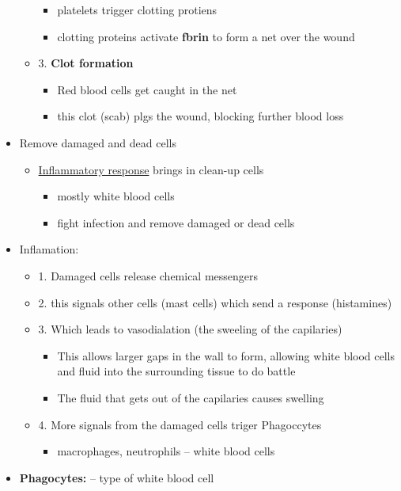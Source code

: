 \documentclass{article}
\theoremstyle{definition}
\begin{document}
\begin{itemize}
\begin{itemize}
\begin{itemize}
					\item platelets trigger clotting protiens
					\item clotting proteins activate \textbf{fbrin}  to form a net over the wound
				\end{itemize}
			\item 3. \textbf{Clot formation} 
				\begin{itemize}
					\item Red blood cells get caught in the net 
					\item this clot (scab) plgs the wound, blocking further blood loss
				\end{itemize}
		\end{itemize}
	\item Remove damaged and dead cells
		\begin{itemize}
			\item \underline{Inflammatory response} brings in clean-up cells
				\begin{itemize}
					\item mostly white blood cells
					\item fight infection and remove damaged or dead cells
				\end{itemize}
		\end{itemize}
	\item Inflamation:
		\begin{itemize}
			\item 1. Damaged cells release chemical messengers
			\item 2. this signals other cells (mast cells) which send a response (histamines)
			\item 3. Which leads to vasodialation (the sweeling of the capilaries)
				\begin{itemize}
					\item This allows larger gaps in the wall to form, allowing white blood cells and fluid into the surrounding tissue to do battle
					\item The fluid that gets out of the capilaries causes swelling
				\end{itemize}
			\item 4. More signals from the damaged cells triger Phagoccytes
				\begin{itemize}
					\item macrophages, neutrophils -- white blood cells
				\end{itemize}
		\end{itemize}
	\item \textbf{Phagocytes:} -- type of white blood cell

\end{itemize}
\end{document}
